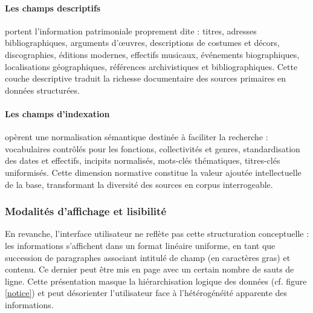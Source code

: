 \paragraph{Les champs descriptifs} portent l'information patrimoniale proprement dite : titres, adresses bibliographiques, arguments d'œuvres, descriptions de costumes et décors, discographies, éditions modernes, effectifs musicaux, événements biographiques, localisations géographiques, références archivistiques et bibliographiques. Cette couche descriptive traduit la richesse documentaire des sources primaires en données structurées.

\paragraph{Les champs d'indexation} opèrent une normalisation sémantique destinée à faciliter la recherche : vocabulaires contrôlés pour les fonctions, collectivités et genres, standardisation des dates et effectifs, incipits normalisés, mots-clés thématiques, titres-clés uniformisés. Cette dimension normative constitue la valeur ajoutée intellectuelle de la base, transformant la diversité des sources en corpus interrogeable.

\subsubsection{Modalités d'affichage et lisibilité}

En revanche, l'interface utilisateur ne reflète pas cette structuration conceptuelle : les informations s'affichent dans un format linéaire uniforme, en tant que succession de paragraphes associant intitulé de champ (en caractères gras) et contenu. Ce dernier peut être mis en page avec un certain nombre de sauts de ligne. Cette présentation  masque la hiérarchisation logique des données (cf. figure \ref{notice}) et peut désorienter l'utilisateur face à l'hétérogénéité apparente des informations.

